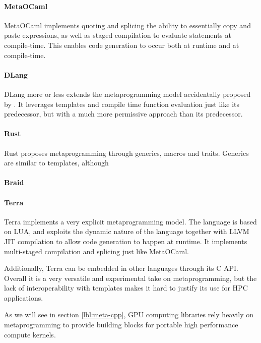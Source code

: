 \documentclass[../../main.tex]{subfiles}
\begin{document}
\paragraph{MetaOCaml}

MetaOCaml\cite{metaocaml} implements quoting and splicing
\ie the ability to essentially copy and paste expressions,
as well as staged compilation to evaluate statements at compile-time.
This enables code generation to occur both at runtime and at compile-time.

\paragraph{DLang}

DLang more or less extends the metaprogramming model accidentally proposed
by \cpp. It leverages templates and compile time function evaluation just like
its predecessor, but with a much more permissive approach than its predecessor.


\paragraph{Rust}

Rust proposes metaprogramming through generics, macros and traits.
Generics are similar to \cpp templates, although

\paragraph{Braid}

\paragraph{Terra}

Terra\cite{terra} implements a very explicit metaprogramming model.
The language is based on LUA, and exploits the dynamic nature of the language
together with LLVM JIT compilation to allow code generation
to happen at runtime.
It implements multi-staged compilation and splicing just like MetaOCaml.

Additionally, Terra can be embedded in other languages through its C API.
Overall it is a very versatile and experimental take on metaprogramming,
but the lack of interoperability with \cpp templates makes it hard to justify
its use for HPC applications.

As we will see in section \ref{lbl:meta-cpp}, GPU computing libraries
rely heavily on \cpp metaprogramming to provide building blocks for
portable high performance compute kernels.
\end{document}
